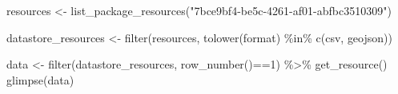 \documentclass[
]{article}
\newenvironment{Shaded}{\begin{snugshade}}{\end{snugshade}}
\newcommand{\DecValTok}[1]{\textcolor[rgb]{0.00,0.00,0.81}{#1}}
\newcommand{\FunctionTok}[1]{\textcolor[rgb]{0.00,0.00,0.00}{#1}}
\newcommand{\NormalTok}[1]{#1}
\newcommand{\OtherTok}[1]{\textcolor[rgb]{0.56,0.35,0.01}{#1}}
\newcommand{\SpecialCharTok}[1]{\textcolor[rgb]{0.00,0.00,0.00}{#1}}
\newcommand{\StringTok}[1]{\textcolor[rgb]{0.31,0.60,0.02}{#1}}
\begin{document}
\begin{Shaded}
\begin{Highlighting}[]
\NormalTok{resources }\OtherTok{\textless{}{-}} \FunctionTok{list\_package\_resources}\NormalTok{(}\StringTok{"7bce9bf4{-}be5c{-}4261{-}af01{-}abfbc3510309"}\NormalTok{)}

\NormalTok{datastore\_resources }\OtherTok{\textless{}{-}} \FunctionTok{filter}\NormalTok{(resources, }\FunctionTok{tolower}\NormalTok{(format) }\SpecialCharTok{\%in\%} \FunctionTok{c}\NormalTok{(}\StringTok{\textquotesingle{}csv\textquotesingle{}}\NormalTok{, }\StringTok{\textquotesingle{}geojson\textquotesingle{}}\NormalTok{))}
 
\NormalTok{data }\OtherTok{\textless{}{-}} \FunctionTok{filter}\NormalTok{(datastore\_resources, }\FunctionTok{row\_number}\NormalTok{()}\SpecialCharTok{==}\DecValTok{1}\NormalTok{) }\SpecialCharTok{\%\textgreater{}\%} \FunctionTok{get\_resource}\NormalTok{()}
\FunctionTok{glimpse}\NormalTok{(data)}
\end{Highlighting}
\end{Shaded}
\end{document}
